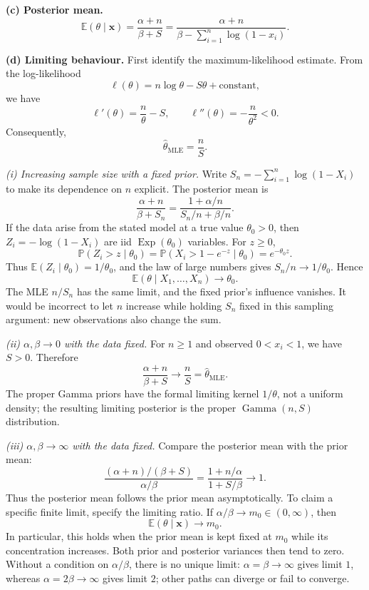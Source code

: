 \documentclass[11pt,a4paper]{article}
\newcommand{\xvec}{\boldsymbol{x}}
\newcommand{\E}{\mathbb{E}}
\begin{document}
\textbf{(c) Posterior mean.}
\[
\boxed{\E(\theta\mid\xvec)=\frac{\alpha+n}{\beta+S}
=\frac{\alpha+n}{\beta-\sum_{i=1}^{n}\log(1-x_i)}.}
\]

\textbf{(d) Limiting behaviour.}
First identify the maximum-likelihood estimate. From the log-likelihood
\[
\ell(\theta)=n\log\theta-S\theta+\text{constant},
\]
we have
\[
\ell'(\theta)=\frac n\theta-S,\qquad
\ell''(\theta)=-\frac n{\theta^2}<0.
\]
Consequently,
\[
\widehat\theta_{\mathrm{MLE}}=\frac nS.
\]

\emph{(i) Increasing sample size with a fixed prior.}
Write $S_n=-\sum_{i=1}^{n}\log(1-X_i)$ to make its dependence on $n$
explicit. The posterior mean is
\[
\frac{\alpha+n}{\beta+S_n}
=\frac{1+\alpha/n}{S_n/n+\beta/n}.
\]
If the data arise from the stated model at a true value $\theta_0>0$, then
$Z_i=-\log(1-X_i)$ are iid $\operatorname{Exp}(\theta_0)$ variables. For
$z\geq0$,
\[
\mathbb{P}(Z_i>z\mid\theta_0)
=\mathbb{P}(X_i>1-e^{-z}\mid\theta_0)=e^{-\theta_0z}.
\]
Thus $\E(Z_i\mid\theta_0)=1/\theta_0$, and the law of large numbers gives
$S_n/n\to1/\theta_0$. Hence
\[
\boxed{\E(\theta\mid X_1,\ldots,X_n)\longrightarrow\theta_0.}
\]
The MLE $n/S_n$ has the same limit, and the fixed prior's influence vanishes.
It would be incorrect to let $n$ increase while holding $S_n$ fixed in this
sampling argument: new observations also change the sum.

\emph{(ii) $\alpha,\beta\to0$ with the data fixed.}
For $n\geq1$ and observed $0<x_i<1$, we have $S>0$. Therefore
\[
\boxed{\frac{\alpha+n}{\beta+S}\longrightarrow\frac nS
=\widehat\theta_{\mathrm{MLE}}.}
\]
The proper Gamma priors have the formal limiting kernel $1/\theta$, not a
uniform density; the resulting limiting posterior is the proper
$\operatorname{Gamma}(n,S)$ distribution.

\emph{(iii) $\alpha,\beta\to\infty$ with the data fixed.}
Compare the posterior mean with the prior mean:
\[
\frac{(\alpha+n)/(\beta+S)}{\alpha/\beta}
=\frac{1+n/\alpha}{1+S/\beta}\longrightarrow1.
\]
Thus the posterior mean follows the prior mean asymptotically. To claim a
specific finite limit, specify the limiting ratio. If
$\alpha/\beta\to m_0\in(0,\infty)$, then
\[
\boxed{\E(\theta\mid\xvec)\longrightarrow m_0.}
\]
In particular, this holds when the prior mean is kept fixed at $m_0$ while
its concentration increases. Both prior and posterior variances then tend
to zero. Without a condition on $\alpha/\beta$, there is no unique limit:
$\alpha=\beta\to\infty$ gives limit $1$, whereas
$\alpha=2\beta\to\infty$ gives limit $2$; other paths can diverge or fail
to converge.
\end{document}
